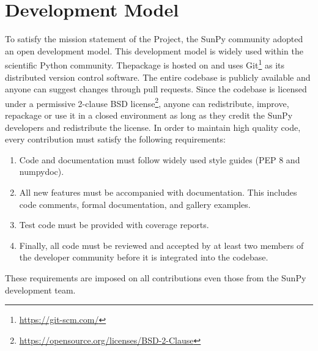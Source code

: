 \section{Development Model}

To satisfy the mission statement of the Project, the SunPy community adopted an open development model.
This development model is widely used within the scientific Python community.
The\sunpypkg package is hosted on \github and uses Git\footnote{\url{https://git-scm.com/}} as its distributed version control software.
The entire codebase is publicly available and anyone can suggest changes through pull requests.
Since the codebase is licensed under a permissive 2-clause BSD license\footnote{\url{https://opensource.org/licenses/BSD-2-Clause}}, anyone can redistribute, improve, repackage or use it in a closed environment as long as they credit the SunPy developers and redistribute the license.
In order to maintain high quality code, every contribution must satisfy the following requirements:
\begin{enumerate}
    \item Code and documentation must follow widely used style guides (PEP 8 and numpydoc).
    \item All new features must be accompanied with documentation.
    This includes code comments, formal documentation, and gallery examples.
    \item Test code must be provided with coverage reports.
    \item Finally, all code must be reviewed and accepted by at least two members of the developer community before it is integrated into the codebase.
\end{enumerate}
These requirements are imposed on all contributions even those from the SunPy development team.

